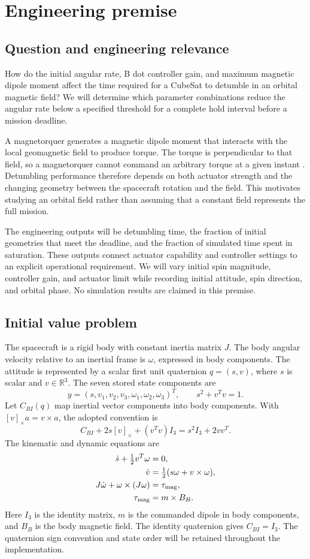 \section{Engineering premise}

\subsection{Question and engineering relevance}
How do the initial angular rate, B dot controller gain, and maximum magnetic dipole moment affect the time required for a CubeSat to detumble in an orbital magnetic field? We will determine which parameter combinations reduce the angular rate below a specified threshold for a complete hold interval before a mission deadline.

A magnetorquer generates a magnetic dipole moment that interacts with the local geomagnetic field to produce torque. The torque is perpendicular to that field, so a magnetorquer cannot command an arbitrary torque at a given instant \cite{nasa_gnc}. Detumbling performance therefore depends on both actuator strength and the changing geometry between the spacecraft rotation and the field. This motivates studying an orbital field rather than assuming that a constant field represents the full mission.

The engineering outputs will be detumbling time, the fraction of initial geometries that meet the deadline, and the fraction of simulated time spent in saturation. These outputs connect actuator capability and controller settings to an explicit operational requirement. We will vary initial spin magnitude, controller gain, and actuator limit while recording initial attitude, spin direction, and orbital phase. No simulation results are claimed in this premise.

\subsection{Initial value problem}
The spacecraft is a rigid body with constant inertia matrix \(J\). The body angular velocity relative to an inertial frame is \(\omega\), expressed in body components. The attitude is represented by a scalar first unit quaternion \(q=(s,v)\), where \(s\) is scalar and \(v\in\mathbb R^3\). The seven stored state components are
\[
y=(s,v_1,v_2,v_3,\omega_1,\omega_2,\omega_3)^T,
\qquad s^2+v^Tv=1.
\]
Let \(C_{BI}(q)\) map inertial vector components into body components. With \([v]_\times a=v\times a\), the adopted convention is
\[
C_{BI}+2s[v]_\times+(v^Tv)I_3=s^2I_3+2vv^T.
\]
The kinematic and dynamic equations are
\begin{align}
\dot s+\tfrac12 v^T\omega&=0,\\
\dot v&=\tfrac12(s\omega+v\times\omega),\\
J\dot\omega+\omega\times(J\omega)&=\tau_{\rm mag},\\
\tau_{\rm mag}&=m\times B_B.
\end{align}
Here \(I_3\) is the identity matrix, \(m\) is the commanded dipole in body components, and \(B_B\) is the body magnetic field. The identity quaternion gives \(C_{BI}=I_3\). The quaternion sign convention and state order will be retained throughout the implementation.

